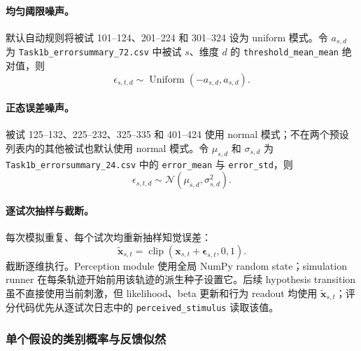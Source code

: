 \paragraph{均匀阈限噪声。}
默认自动规则将被试 101--124、201--224 和 301--324 设为 uniform 模式。令 $a_{s,d}$ 为 \texttt{Task1b\_errorsummary\_72.csv} 中被试 $s$、维度 $d$ 的 \texttt{threshold\_mean\_mean} 绝对值，则
\begin{equation}
    \epsilon_{s,t,d}
    \sim
    \operatorname{Uniform}(-a_{s,d},a_{s,d}).
    \label{eq:modelv14-perception-uniform}
\end{equation}

\paragraph{正态误差噪声。}
被试 125--132、225--232、325--335 和 401--424 使用 normal 模式；不在两个预设列表内的其他被试也默认使用 normal 模式。令 $\mu_{s,d}$ 和 $\sigma_{s,d}$ 为 \texttt{Task1b\_errorsummary\_24.csv} 中的 \texttt{error\_mean} 与 \texttt{error\_std}，则
\begin{equation}
    \epsilon_{s,t,d}
    \sim
    \mathcal N(\mu_{s,d},\sigma_{s,d}^{2}).
    \label{eq:modelv14-perception-normal}
\end{equation}

\paragraph{逐试次抽样与截断。}
每次模拟重复、每个试次均重新抽样知觉误差：
\begin{equation}
    \widetilde{\mathbf x}_{s,t}
    =
    \operatorname{clip}
    \left(
        \mathbf x_{s,t}
        +
        \bm\epsilon_{s,t},
        0,1
    \right).
    \label{eq:modelv14-perceived-stimulus}
\end{equation}
截断逐维执行。Perception module 使用全局 NumPy random state；simulation runner 在每条轨迹开始前用该轨迹的派生种子设置它。后续 hypothesis transition 虽不直接使用当前刺激，但 likelihood、beta 更新和行为 readout 均使用 $\widetilde{\mathbf x}_{s,t}$；评分代码优先从逐试次日志中的 \texttt{perceived\_stimulus} 读取该值。


\subsubsection{单个假设的类别概率与反馈似然}

